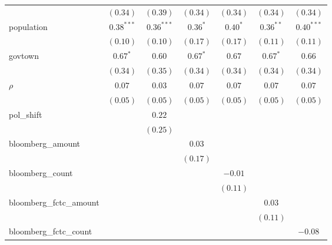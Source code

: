 \begin{table}[!h]
\begin{center}
\begin{tabular}{l c c c c c c }
                        & $(0.34)$      & $(0.39)$      & $(0.34)$      & $(0.34)$      & $(0.34)$      & $(0.34)$      \\
population              & $0.38^{***}$  & $0.36^{***}$  & $0.36^{*}$    & $0.40^{*}$    & $0.36^{**}$   & $0.40^{***}$  \\
                        & $(0.10)$      & $(0.10)$      & $(0.17)$      & $(0.17)$      & $(0.11)$      & $(0.11)$      \\
govtown                 & $0.67^{*}$    & $0.60$        & $0.67^{*}$    & $0.67$        & $0.67^{*}$    & $0.66$        \\
                        & $(0.34)$      & $(0.35)$      & $(0.34)$      & $(0.34)$      & $(0.34)$      & $(0.34)$      \\
$\rho$                  & $0.07$        & $0.03$        & $0.07$        & $0.07$        & $0.07$        & $0.07$        \\
                        & $(0.05)$      & $(0.05)$      & $(0.05)$      & $(0.05)$      & $(0.05)$      & $(0.05)$      \\
pol\_shift              &               & $0.22$        &               &               &               &               \\
                        &               & $(0.25)$      &               &               &               &               \\
bloomberg\_amount       &               &               & $0.03$        &               &               &               \\
                        &               &               & $(0.17)$      &               &               &               \\
bloomberg\_count        &               &               &               & $-0.01$       &               &               \\
                        &               &               &               & $(0.11)$      &               &               \\
bloomberg\_fctc\_amount &               &               &               &               & $0.03$        &               \\
                        &               &               &               &               & $(0.11)$      &               \\
bloomberg\_fctc\_count  &               &               &               &               &               & $-0.08$       \\

\end{tabular}
\end{center}
\end{table}

